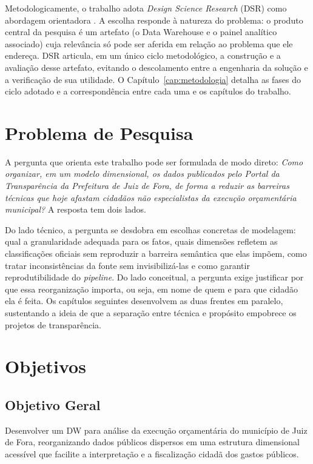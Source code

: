 Metodologicamente, o trabalho adota \textit{Design Science Research} (DSR) como abordagem orientadora \cite{hevner2004, dresch2015}. A escolha responde à natureza do problema: o produto central da pesquisa é um artefato (o Data Warehouse e o painel analítico associado) cuja relevância só pode ser aferida em relação ao problema que ele endereça. DSR articula, em um único ciclo metodológico, a construção e a avaliação desse artefato, evitando o descolamento entre a engenharia da solução e a verificação de sua utilidade. O Capítulo~\ref{cap:metodologia} detalha as fases do ciclo adotado e a correspondência entre cada uma e os capítulos do trabalho.

\section{Problema de Pesquisa}

A pergunta que orienta este trabalho pode ser formulada de modo direto: \textit{Como organizar, em um modelo dimensional, os dados publicados pelo Portal da Transparência da Prefeitura de Juiz de Fora, de forma a reduzir as barreiras técnicas que hoje afastam cidadãos não especialistas da execução orçamentária municipal?} A resposta tem dois lados. 

Do lado técnico, a pergunta se desdobra em escolhas concretas de modelagem: qual a granularidade adequada para os fatos, quais dimensões refletem as classificações oficiais sem reproduzir a barreira semântica que elas impõem, como tratar inconsistências da fonte sem invisibilizá-las e como garantir reprodutibilidade do \textit{pipeline}. Do lado conceitual, a pergunta exige justificar por que essa reorganização importa, ou seja, em nome de quem e para que cidadão ela é feita. Os capítulos seguintes desenvolvem as duas frentes em paralelo, sustentando a ideia de que a separação entre técnica e propósito empobrece os projetos de transparência.

\section{Objetivos}
\subsection*{Objetivo Geral}
Desenvolver um DW para análise da execução orçamentária do município de Juiz de Fora, reorganizando dados públicos dispersos em uma estrutura dimensional acessível que facilite a interpretação e a fiscalização cidadã dos gastos públicos.


